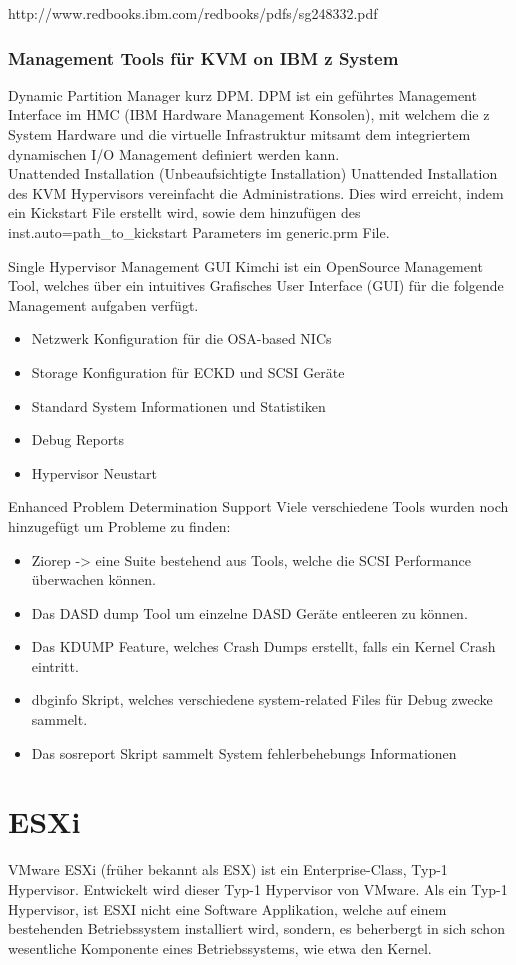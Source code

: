 \documentclass[14pt]{extreport}
\begin{document}
http://www.redbooks.ibm.com/redbooks/pdfs/sg248332.pdf

\subsection{Management Tools für KVM on IBM z System}
Dynamic Partition Manager kurz DPM.
DPM ist ein geführtes Management Interface im HMC (IBM Hardware Management Konsolen), mit welchem die z System Hardware und die virtuelle Infrastruktur mitsamt dem integriertem dynamischen I/O Management  definiert werden kann.\\
Unattended Installation (Unbeaufsichtigte Installation)
Unattended Installation des KVM Hypervisors vereinfacht die Administrations. Dies wird erreicht, indem ein Kickstart File erstellt wird, sowie dem hinzufügen des inst.auto=path\_to\_kickstart  Parameters im generic.prm File.

Single Hypervisor Management GUI
Kimchi ist ein OpenSource Management Tool, welches über ein intuitives Grafisches User Interface (GUI) für die folgende Management aufgaben verfügt.
\begin{itemize}
   \item Netzwerk Konfiguration für die OSA-based NICs
   \item Storage Konfiguration für ECKD und SCSI Geräte
   \item Standard System Informationen und Statistiken
   \item Debug Reports
   \item Hypervisor Neustart
\end{itemize}
\newpage
Enhanced Problem Determination Support
Viele verschiedene Tools wurden noch hinzugefügt um Probleme zu finden:
\begin{itemize}
   \item Ziorep -> eine Suite bestehend aus Tools, welche die SCSI Performance überwachen können.
   \item Das DASD dump Tool um einzelne DASD Geräte entleeren zu können.
   \item Das KDUMP Feature, welches Crash Dumps erstellt, falls ein Kernel Crash eintritt.
   \item dbginfo Skript, welches verschiedene system-related Files für Debug zwecke sammelt.
   \item Das sosreport Skript sammelt System fehlerbehebungs Informationen
\end{itemize}

\chapter{ESXi}
VMware ESXi (früher bekannt als ESX) ist ein Enterprise-Class, Typ-1 Hypervisor. Entwickelt wird dieser Typ-1 Hypervisor von VMware. Als ein Typ-1 Hypervisor, ist ESXI nicht eine Software Applikation, welche auf einem bestehenden Betriebssystem installiert wird, sondern, es beherbergt in sich schon wesentliche Komponente eines Betriebssystems, wie etwa den Kernel. \\
\end{document}
